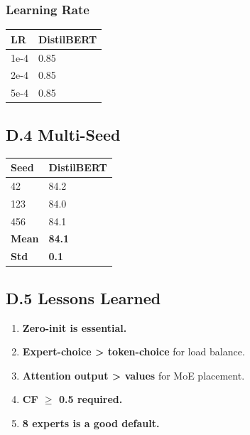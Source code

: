 \subsubsection{Learning Rate}

\begin{table}[H]
\centering
\small
\begin{tabular}{ll}
\toprule
\textbf{LR} & \textbf{DistilBERT} \\
\midrule
1e-4 & 0.85 \\
2e-4 & 0.85 \\
5e-4 & 0.85 \\
\bottomrule
\end{tabular}
\end{table}

\subsection{D.4 Multi-Seed}

\begin{table}[H]
\centering
\small
\begin{tabular}{ll}
\toprule
\textbf{Seed} & \textbf{DistilBERT} \\
\midrule
42 & 84.2 \\
123 & 84.0 \\
456 & 84.1 \\
\textbf{Mean} & \textbf{84.1} \\
\textbf{Std} & \textbf{0.1} \\
\bottomrule
\end{tabular}
\end{table}

\subsection{D.5 Lessons Learned}

\begin{enumerate}
\item \textbf{Zero-init is essential.}
\item \textbf{Expert-choice > token-choice} for load balance.
\item \textbf{Attention output > values} for MoE placement.
\item \textbf{CF $\ge$ 0.5 required.}
\item \textbf{8 experts is a good default.}

\end{enumerate}
